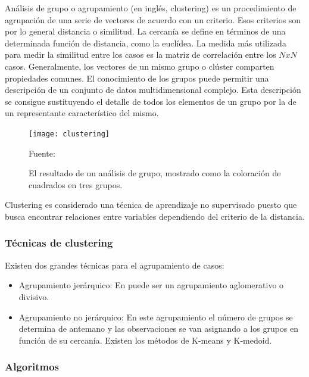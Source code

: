 Análisis de grupo o agrupamiento (en inglés, clustering) es un procedimiento de agrupación de una serie de vectores de acuerdo con un criterio. Esos criterios son por lo general distancia o similitud. La cercanía se define en términos de una determinada función de distancia, como la euclídea. La medida más utilizada para medir la similitud entre los casos es la matriz de correlación entre los \( N x N \) casos.
\vskip 1cm
Generalmente, los vectores de un mismo grupo o clúster comparten propiedades comunes. El conocimiento de los grupos puede permitir una descripción de un conjunto de datos multidimensional complejo. Esta descripción se consigue sustituyendo el detalle de todos los elementos de un grupo por la de un representante característico del mismo.

\begin{figure}[ht]
	\begin{center}
		\texttt{[image: clustering]}
	\end{center}
	\begin{center}
		\vskip -0.5cm
		\caption{\small{El resultado de un análisis de grupo, mostrado como la coloración de cuadrados en tres grupos.}}
		{\small{Fuente: }}
	\end{center}
\end{figure}

Clustering es considerado una técnica de aprendizaje no supervisado puesto que busca encontrar relaciones entre variables dependiendo del criterio de la distancia.


\subsubsection{Técnicas de clustering}

Existen dos grandes técnicas para el agrupamiento de casos:

\begin{itemize}
	\item Agrupamiento jerárquico: En puede ser un agrupamiento aglomerativo o divisivo.
	\item Agrupamiento no jerárquico: En este agrupamiento el número de grupos se determina de antemano y las observaciones se van asignando a los grupos en función de su cercanía. Existen los métodos de K-means y K-medoid.

\end{itemize}

\subsubsection{Algoritmos}

